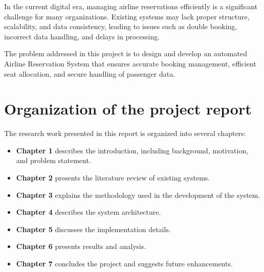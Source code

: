 In the current digital era, managing airline reservations efficiently is a significant challenge for many organizations. Existing systems may lack proper structure, scalability, and data consistency, leading to issues such as double booking, incorrect data handling, and delays in processing.

The problem addressed in this project is to design and develop an automated Airline Reservation System that ensures accurate booking management, efficient seat allocation, and secure handling of passenger data.

\section{Organization of the project report}

The research work presented in this report is organized into several chapters:

\begin{itemize}
\item \textbf{Chapter 1} describes the introduction, including background, motivation, and problem statement.
\item \textbf{Chapter 2} presents the literature review of existing systems.
\item \textbf{Chapter 3} explains the methodology used in the development of the system.
\item \textbf{Chapter 4} describes the system architecture.
\item \textbf{Chapter 5} discusses the implementation details.
\item \textbf{Chapter 6} presents results and analysis.
\item \textbf{Chapter 7} concludes the project and suggests future enhancements.
\end{itemize}